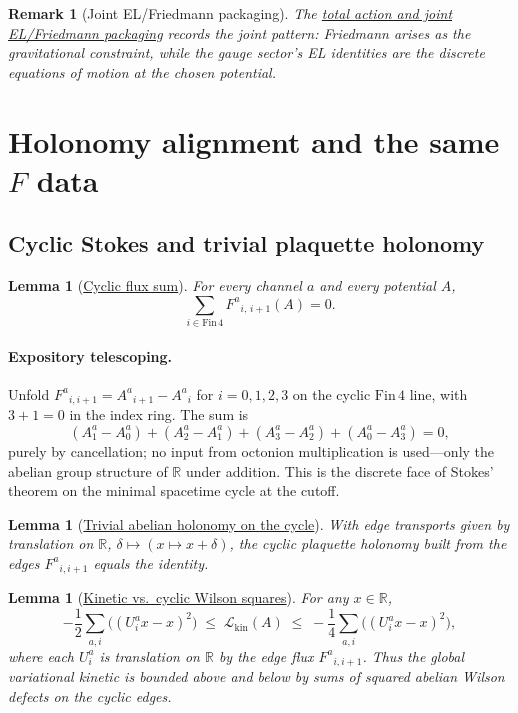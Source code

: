 \documentclass[11pt]{amsart}
\newtheorem{lemma}[theorem]{Lemma}
\newtheorem{remark}[theorem]{Remark}
\begin{document}
\begin{remark}[Joint EL/Friedmann packaging]
The \hyperref[lean:total-action]{total action and joint EL/Friedmann packaging} records the joint pattern: Friedmann arises as the gravitational constraint, while the gauge sector's EL identities are the discrete equations of motion at the chosen potential.
\end{remark}

\section{Holonomy alignment and the same \texorpdfstring{$F$}{F} data}
\label{sec:holonomy}

\subsection{Cyclic Stokes and trivial plaquette holonomy}

\begin{lemma}[\texorpdfstring{\hyperref[lean:cyclic-flux]{Cyclic flux sum}}{Cyclic flux sum}]
\label{lem:stokes}
For every channel \(a\) and every potential \(A\),
\[
\sum_{i\in \mathrm{Fin}\,4} F^a{}_{i,\,i+1}(A) = 0 .
\]
\end{lemma}

\paragraph{Expository telescoping.}
Unfold \(F^a{}_{i,i+1}=A^a{}_{i+1}-A^a{}_i\) for \(i=0,1,2,3\) on the cyclic \(\mathrm{Fin}\,4\) line, with \(3+1=0\) in the index ring. The sum is
\[
(A^a_1{-}A^a_0)+(A^a_2{-}A^a_1)+(A^a_3{-}A^a_2)+(A^a_0{-}A^a_3)=0,
\]
purely by cancellation; no input from octonion multiplication is used---only the abelian group structure of \(\mathbb{R}\) under addition. This is the discrete face of Stokes' theorem on the minimal spacetime cycle at the cutoff.

\begin{lemma}[\texorpdfstring{\hyperref[lean:trivial-holonomy]{Trivial abelian holonomy on the cycle}}{Trivial abelian holonomy on the cycle}]
\label{lem:hol-one}
With edge transports given by translation on \(\mathbb{R}\), \(\delta\mapsto (x\mapsto x+\delta)\), the cyclic plaquette holonomy built from the edges \(F^a{}_{i,i+1}\) equals the identity.
\end{lemma}

\begin{lemma}[\texorpdfstring{\hyperref[lean:wilson-bounds]{Kinetic vs.\ cyclic Wilson squares}}{Kinetic vs. cyclic Wilson squares}]
\label{lem:wilson-bounds}
For any \(x\in\mathbb{R}\),
\[
-\frac12 \sum_{a,i} \bigl((U^a_i x-x)^2\bigr)
\;\le\; \mathcal{L}_{\mathrm{kin}}(A)
\;\le\; -\frac14 \sum_{a,i} \bigl((U^a_i x-x)^2\bigr),
\]
where each \(U^a_i\) is translation on \(\mathbb{R}\) by the edge flux \(F^a{}_{i,i+1}\). Thus the global variational kinetic is bounded above and below by sums of squared abelian Wilson defects on the cyclic edges.
\end{lemma}
\end{document}
